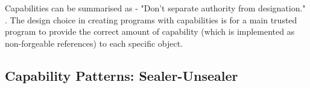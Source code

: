 
Capabilities can be summarised as - "Don't separate authority from designation." \cite{markCapsMyth}. The design choice in creating programs with capabilities is for a main trusted program to provide the correct amount of capability (which is implemented as non-forgeable references) to each specific object.  





\subsection{Capability Patterns: Sealer-Unsealer}

